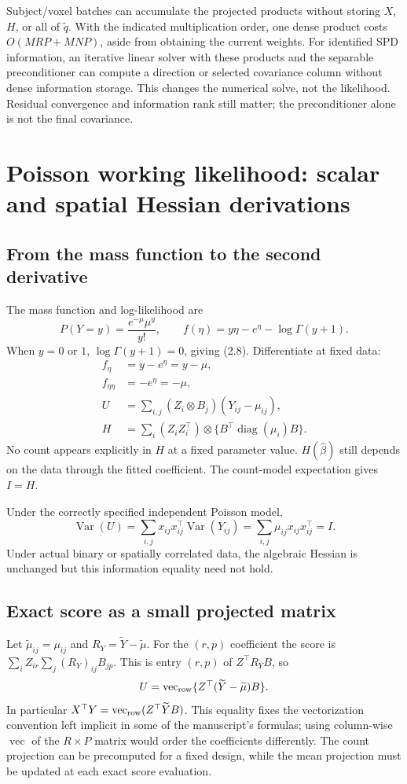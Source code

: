 \documentclass[11pt,a4paper]{article}
\newcommand{\Var}{\operatorname{Var}}
\newcommand{\diag}{\operatorname{diag}}
\newcommand{\vr}{\operatorname{vec}_{\rm row}}
\numberwithin{equation}{section}
\begin{document}
Subject/voxel batches can accumulate the projected products without
storing $X$, $H$, or all of $\widetilde q$.
With the indicated multiplication order, one dense product costs
$O(MRP+MNP)$, aside from obtaining the current weights.
For identified SPD information, an iterative linear solver with
these products and the separable preconditioner can compute a
direction or selected covariance column without dense information
storage. This changes the numerical solve, not the likelihood.
Residual convergence and information rank still matter; the
preconditioner alone is not the final covariance.

\section{Poisson working likelihood: scalar and spatial Hessian derivations}

\subsection{From the mass function to the second derivative}
The mass function and log-likelihood are
\[
 P(Y=y)=\frac{e^{-\mu}\mu^y}{y!},\qquad
 f(\eta)=y\eta-e^\eta-\log\Gamma(y+1).
\]
When $y=0$ or $1$, $\log\Gamma(y+1)=0$, giving (2.8).
Differentiate at fixed data:
\begin{align}
 f_\eta&=y-e^\eta=y-\mu,\\
 f_{\eta\eta}&=-e^\eta=-\mu,\\
 U&=\sum_{i,j}(Z_i\otimes B_j)(Y_{ij}-\mu_{ij}),\\
 H&=\sum_i(Z_iZ_i^\top)\otimes
                     \{B^\top\diag(\mu_i)B\}.
 \label{lesion-poisson-h}
\end{align}
No count appears explicitly in $H$ at a fixed parameter value.
$H(\widehat\beta)$ still depends on the data through the fitted coefficient.
The count-model expectation gives $I=H$.

Under the correctly specified independent Poisson model,
\[
 \Var(U)=\sum_{i,j}x_{ij}x_{ij}^\top\Var(Y_{ij})
        =\sum_{i,j}\mu_{ij}x_{ij}x_{ij}^\top=I.
\]
Under actual binary or spatially correlated data, the algebraic
Hessian is unchanged but this information equality need not hold.

\subsection{Exact score as a small projected matrix}
Let $\widetilde\mu_{ij}=\mu_{ij}$ and $R_Y=\widetilde Y-\widetilde\mu$.
For the $(r,p)$ coefficient the score is
$\sum_i Z_{ir}\sum_j(R_Y)_{ij}B_{jp}$.
This is entry $(r,p)$ of $Z^\top R_YB$, so
\begin{equation}\label{lesion-score-matrix}
 U=\vr\{Z^\top(\widetilde Y-\widetilde\mu)B\}.
\end{equation}
In particular $X^\top Y=\vr(Z^\top\widetilde YB)$.
This equality fixes the vectorization convention left implicit in some
of the manuscript's formulas; using column-wise $\operatorname{vec}$
of the $R\times P$ matrix would order the coefficients differently.
The count projection can be precomputed for a fixed design, while the
mean projection must be updated at each exact score evaluation.
\end{document}
